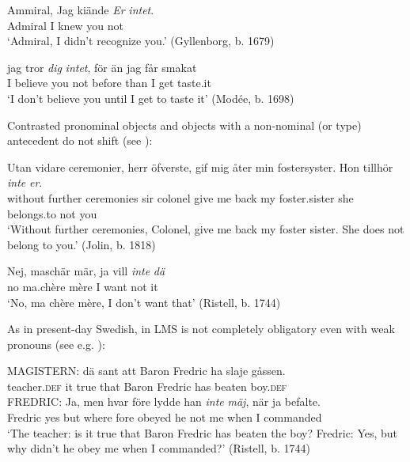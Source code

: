 \documentclass[output=paper]{langscibook}
\begin{document}
\ea\label{ex:intro:17}
\ea\label{ex:intro:17a}
\gll  Ammiral, Jag   kiände \textit{Er} \textit{intet}.\\
    Admiral   I       knew   you       not\\
    \glt ‘Admiral, I didn’t recognize you.’ (Gyllenborg, b. 1679)


\ex\label{ex:intro:17b}
\gll  jag tror \textit{dig} \textit{intet},   för     än   jag   får smakat \\
    I     believe you     not     before   than   I     get taste.it\\
    \glt ‘I don’t believe you until I get to taste it’ (Modée, b. 1698)
\z
\z


Contrasted pronominal objects and objects with a non-nominal (or type) antecedent do not shift (see \citealt{Andreasson2008}):


\ea\label{ex:intro:18}
\ea\label{ex:intro:18a}
\gll  Utan     vidare ceremonier,   herr   öfverste,   gif   mig   åter min fostersyster. Hon   tillhör \textit{inte} \textit{er}.\\
without   further ceremonies   sir   colonel     give me   back my foster.sister she   belongs.to   not   you\\
\glt ‘Without further ceremonies, Colonel, give me back my foster sister. She does not belong to you.’ (Jolin, b. 1818)


\ex\label{ex:intro:18b}
\gll  Nej, maschär   mär,   ja vill \textit{inte} \textit{dä}\\
      no    ma.chère   mère  I  want  not   it\\
 \glt       ‘No, ma chère   mère, I don’t want that’ (Ristell, b. 1744)
\z
\z


As in present-day Swedish,  in LMS is not completely obligatory even with weak pronouns (see e.g. \citealt{Erteschik-ShirJosefsson2017}): 

\ea
\gll  MAGISTERN: dä     sant     att  Baron  Fredric  ha  slaje    gåssen. \\
  teacher\textsc{.def}  it  true   that  Baron  Fredric  has  beaten  boy.\textsc{def}\\

\gll  FREDRIC: Ja, men   hvar    före   lydde    han \textit{inte} \textit{mäj}, när      ja   befalte.\\
 Fredric    yes but   where  fore    obeyed   he    not  me   when    I   commanded\\
 
\glt ‘The teacher: is it true that Baron Fredric has beaten the boy? Fredric: Yes, but why didn’t he obey me when I commanded?’ (Ristell, b. 1744)
\z
\end{document}
